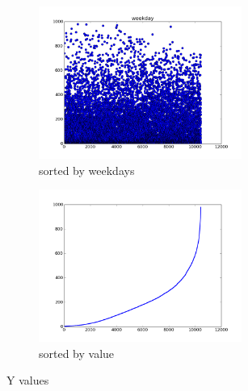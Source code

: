 \documentclass[a4paper, 11pt]{article}
\begin{document}
\begin{figure}[h]
 
\begin{subfigure}[l]{0.5\textwidth}
\includegraphics[width=0.9\linewidth, height=5cm]{Plots/weekdays} 
\caption{sorted by weekdays}
\label{fig:subim3}
\end{subfigure}
\begin{subfigure}[r]{0.5\textwidth}
\includegraphics[width=0.9\linewidth, height=5cm]{Plots/data_sorted}
\caption{sorted by value}
\label{fig:subim4}

\end{subfigure}
\caption{Y values}
\end{figure}
\end{document}
